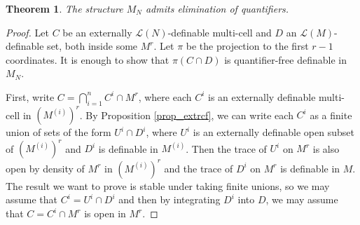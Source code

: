 \documentclass[12pt]{article}
\newtheorem{thm}{Theorem}[section]
\theoremstyle{definition}
\theoremstyle{mystyle}
\theoremstyle{remark}
\newcommand{\clos}[2]{#1^{(#2)}}
\begin{document}
\begin{thm}\label{QEShelahExpPRC}
The structure $M_N$ admits elimination of quantifiers.
\end{thm}
\begin{proof}
Let $C$ be an externally $\mathcal L(N)$-definable multi-cell and $D$ an $\mathcal L(M)$-definable set, both inside some $M^r$. Let $\pi$ be the projection to the first $r-1$ coordinates. It is enough to show that $\pi(C\cap D)$ is quantifier-free definable in $M_N$.

First, write $C = \bigcap_{i=1}^n C^i \cap M^r$, where each $C^ i$ is an externally definable multi-cell in $(\clos{M}{i})^r$. By Proposition \ref{prop_extrcf}, we can write each $C^ i$ as a finite union of sets of the form $U^ i \cap D^ i$, where $U^ i$ is an externally definable open subset of $(\clos{M}{i})^r$ and $D^ i$ is definable in $\clos{M}{i}$. Then the trace of $U^ i$ on $M^r$ is also open by density of $M^r$ in $(\clos{M}{i})^r$ and the trace of $D^ i$ on $M^r$ is definable in $M$. The result we want to prove is stable under taking finite unions, so we may assume that $C^ i = U^ i\cap D^ i$ and then by integrating $D^ i$ into $D$, we may assume that $C=C^ i \cap M^r$ is open in $M^r$.


\end{proof}
\end{document}
